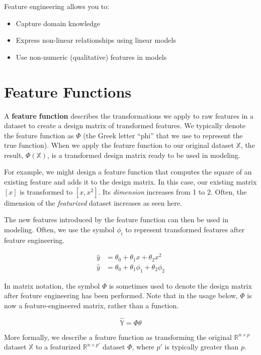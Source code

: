 \documentclass[
  letterpaper,
  DIV=11,
  numbers=noendperiod]{scrreprt}
\providecommand{\tightlist}{%
  \setlength{\itemsep}{0pt}\setlength{\parskip}{0pt}}\usepackage{longtable,booktabs,array}
\begin{document}
Feature engineering allows you to:

\begin{itemize}
\tightlist
\item
  Capture domain knowledge
\item
  Express non-linear relationships using linear models
\item
  Use non-numeric (qualitative) features in models
\end{itemize}

\section{Feature Functions}\label{feature-functions}

A \textbf{feature function} describes the transformations we apply to
raw features in a dataset to create a design matrix of transformed
features. We typically denote the feature function as \(\Phi\) (the
Greek letter ``phi'' that we use to represent the true function). When
we apply the feature function to our original dataset \(\mathbb{X}\),
the result, \(\Phi(\mathbb{X})\), is a transformed design matrix ready
to be used in modeling.

For example, we might design a feature function that computes the square
of an existing feature and adds it to the design matrix. In this case,
our existing matrix \([x]\) is transformed to \([x, x^2]\). Its
\emph{dimension} increases from 1 to 2. Often, the dimension of the
\emph{featurized} dataset increases as seen here.

The new features introduced by the feature function can then be used in
modeling. Often, we use the symbol \(\phi_i\) to represent transformed
features after feature engineering.

\[
\begin{align}
\hat{y} &= \theta_0 + \theta_1 x + \theta_2 x^2 \\
\hat{y} &= \theta_0 + \theta_1 \phi_1 + \theta_2 \phi_2
\end{align}
\]

In matrix notation, the symbol \(\Phi\) is sometimes used to denote the
design matrix after feature engineering has been performed. Note that in
the usage below, \(\Phi\) is now a feature-engineered matrix, rather
than a function.

\[\hat{\mathbb{Y}} = \Phi \theta\]

More formally, we describe a feature function as transforming the
original \(\mathbb{R}^{n \times p}\) dataset \(\mathbb{X}\) to a
featurized \(\mathbb{R}^{n \times p'}\) dataset \(\mathbb{\Phi}\), where
\(p'\) is typically greater than \(p\).
\end{document}
